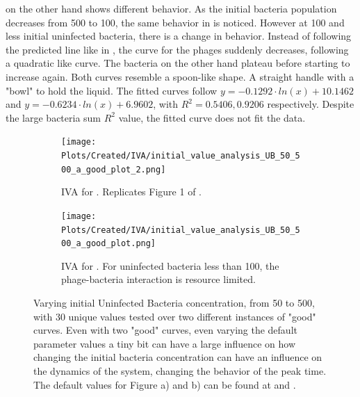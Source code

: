  on the other hand shows different behavior. 
As the initial bacteria population decreases from 500 to 100, the same behavior in  is noticed.
However at 100 and less initial uninfected bacteria, there is a change in behavior. 
Instead of following the predicted line like in , the curve for the phages suddenly decreases, following a quadratic like curve. 
The bacteria on the other hand plateau before starting to increase again. 
Both curves resemble a spoon-like shape. A straight handle with a "bowl" to hold the liquid. 
The fitted curves follow $y = -0.1292\cdot ln(x) + 10.1462$ and $y = -0.6234\cdot ln(x)+6.9602$, with $R^2=0.5406, 0.9206$ respectively. 
Despite the large bacteria sum $R^2$ value, the fitted curve does not fit the data. 

\begin{figure}
    \centering
    \begin{subfigure}{1\linewidth}
        \centering
        \texttt{[image: Plots/Created/IVA/initial\_value\_analysis\_UB\_50\_500\_a\_good\_plot\_2.png]}
        \caption{
            IVA for . 
            Replicates Figure 1 of \citet{mullaExtremeDiversityPhage2024}. 
        }
        \label{fig:created:initial_value_analysis_UB_50_500_a_good_plot_2}
    \end{subfigure}
    \hfill
    \begin{subfigure}{1\linewidth}
        \centering
        \texttt{[image: Plots/Created/IVA/initial\_value\_analysis\_UB\_50\_500\_a\_good\_plot.png]}
        \caption{
            IVA for . 
            For uninfected bacteria less than 100, the phage-bacteria interaction is resource limited. 
        }
        \label{fig:created:initial_value_analysis_UB_50_500_a_good_plot}
    \end{subfigure}
    \caption{
        Varying initial Uninfected Bacteria concentration, from 50 to 500, with 30 unique values tested over two different instances of "good" curves. 
        Even with two "good" curves, even varying the default parameter values a tiny bit can have a large influence on how changing the initial bacteria concentration can have an influence on the dynamics of the system, changing the behavior of the peak time. 
        The default values for Figure a) and b) can be found at  and . 
    }
\end{figure}

